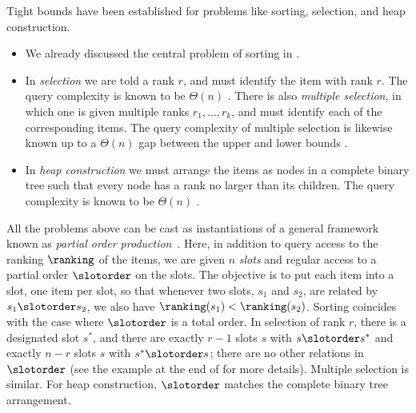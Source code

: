 \documentclass{toc}
\begin{document}
Tight bounds have been established for problems like sorting, selection, and heap construction. 
\begin{itemize}
 \item We already discussed the central problem of sorting in .
 \item In \emph{selection} we are told a rank $r$, and must identify the item with rank $r$. The query complexity is known to be $\Theta(n)$ \cite{BFPRT1973,DorZwick1995,DorZwick1996}. There is also \emph{multiple selection}, in which one is given multiple ranks $r_1,\dots,r_k$, and must identify each of the corresponding items. 
 The query complexity of multiple selection is likewise known up to a $\Theta(n)$ gap between the upper and lower bounds \cite{KMMS2005}.
 \item In \emph{heap construction} we must arrange the items as nodes in a complete binary tree such that every node has a rank no larger than its children. The query complexity is known to be $\Theta(n)$ \cite{CC92,GM86}. 
\end{itemize}

All the problems above can be cast as instantiations of a general framework known as \emph{partial order production}~\cite{Schoenhage1976}. Here, in addition to query access to the ranking $\ranking$ of the items, we are given $n$ \emph{slots} and regular access to a partial order $\slotorder$ on the slots. The objective is to put each item into a slot, one item per slot, so that whenever two slots, $s_1$ and $s_2$, are related by $s_1 \slotorder s_2$, we also have $\ranking(s_1) < \ranking(s_2)$. Sorting coincides with the case where $\slotorder$ is a total order. In selection of rank $r$, there is a designated slot $s^*$, and there are exactly $r-1$ slots $s$ with $s \slotorder s^*$ and exactly $n-r$ slots $s$ with $s^* \slotorder s$; there are no other relations in $\slotorder$ (see the example at the end of  for more details).  Multiple selection is similar. For heap construction, $\slotorder$ matches the complete binary tree arrangement. 
\end{document}
